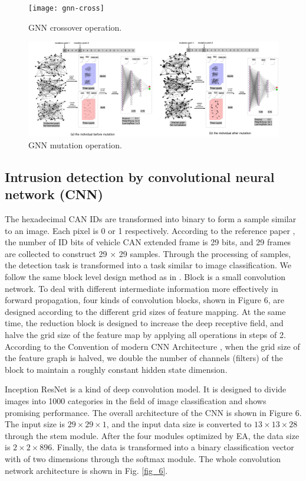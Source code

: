 \documentclass[lettersize,journal]{IEEEtran}
\begin{document}
\begin{figure}[!t]
\centering
\texttt{[image: gnn-cross]}
\caption{GNN crossover operation.}
\label{fig_4}
\end{figure}

\begin{figure}[!t]
\centering
\includegraphics[width=7in]{gnn-mutation}
\caption{GNN mutation operation.}
\label{fig_5}
\end{figure}

\subsection{Intrusion detection by convolutional neural network (CNN)}\label{CNN}

The hexadecimal CAN IDs are transformed into binary to form a sample similar to an image. Each pixel is 0 or 1 respectively. According to the reference paper \cite{48}, the number of ID bits of vehicle CAN extended frame is 29 bits, and 29 frames are collected to construct 29 × 29 samples. Through the processing of samples, the detection task is transformed into a task similar to image classification.  We follow the same block level design method as in \cite{68, 69, 70}. Block is a small convolution network. To deal with different intermediate information more effectively in forward propagation, four kinds of convolution blocks, shown in Figure 6, are designed according to the different grid sizes of feature mapping. At the same time, the reduction block is designed to increase the deep receptive field, and halve the grid size of the feature map by applying all operations in steps of 2. According to the Convention of modern CNN Architecture \cite{71, 72, 73}, when the grid size of the feature graph is halved, we double the number of channels (filters) of the block to maintain a roughly constant hidden state dimension.

Inception ResNet is a kind of deep convolution model. It is designed to divide images into 1000 categories in the field of image classification and shows promising performance. The overall architecture of the CNN is shown in Figure 6. The input size is $29\times29\times1$, and the input data size is converted to $13\times13\times28$ through the stem module. After the four modules optimized by EA, the data size is $2\times2\times896$. Finally, the data is transformed into a binary classification vector with of two dimensions through the softmax module. The whole convolution network architecture is shown in Fig. \ref{fig_6}. 
\end{document}
